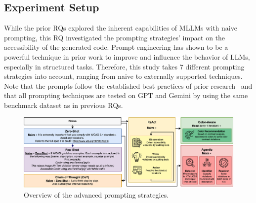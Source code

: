 \subsection{Experiment Setup}
While the prior RQs explored the inherent capabilities of MLLMs with naive
prompting, this RQ investigated the prompting strategies' impact 
on the accessibility of the generated code. Prompt engineering has shown 
to be a powerful technique in prior work to improve and influence the 
behavior of LLMs, especially in structured tasks. Therefore, this study 
takes 7 different prompting strategies into account, ranging from 
naive to externally supported techniques. Note that the prompts follow 
the established best practices of prior research~\cite{suh2025accessiblecode, xiao2024interaction2code} and
that all prompting techniques are tested on GPT and Gemini by using the 
same benchmark dataset as in previous RQs.\newline

\begin{figure}[htbp]
  \centering
  \includegraphics[width=0.85\linewidth]{figures/prompts_new_new.png}
  \caption{Overview of the advanced prompting strategies.}
  \label{fig:prompts_new} 
\end{figure}


